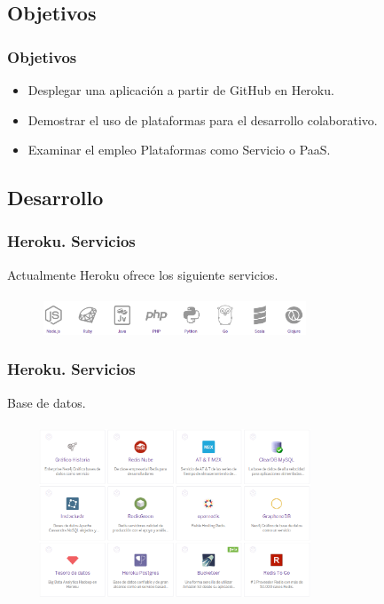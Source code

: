 \documentclass{beamer}
\begin{document}
\subsection{Objetivos}
\begin{frame}
\frametitle{Objetivos}
	\begin{itemize}
		\item Desplegar una aplicación a partir de GitHub en Heroku.
		\item Demostrar el uso de plataformas para el desarrollo colaborativo.
		\item Examinar el empleo Plataformas como Servicio o PaaS.
	\end{itemize}




\end{frame}


\subsection{Desarrollo}
\begin{frame}
\frametitle{Heroku. Servicios}
Actualmente Heroku ofrece los siguiente servicios.\\ \ \\
\includegraphics[width=10cm, height=1cm]{ampliacion/1.png}
\end{frame}

\begin{frame}
\frametitle{Heroku. Servicios}
Base de datos.\\ \ \\
\includegraphics[width=10cm, height=5cm]{ampliacion/2.png}
\end{frame}
\end{document}
